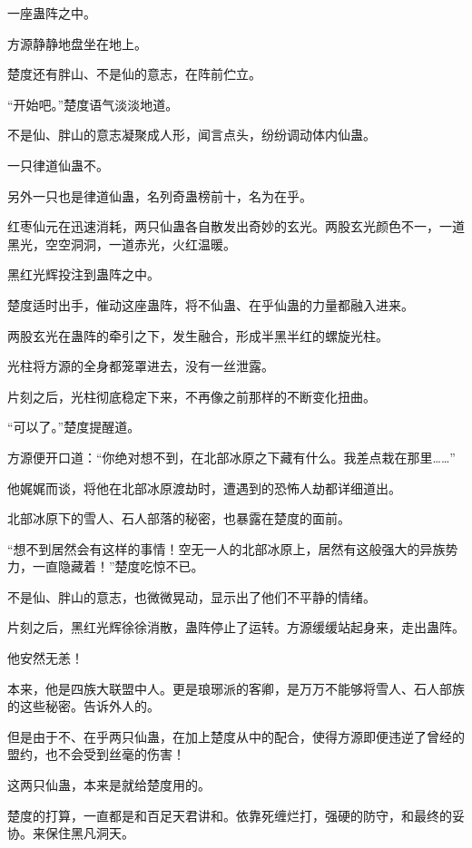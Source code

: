 
\begin{this_body}

一座蛊阵之中。

方源静静地盘坐在地上。

楚度还有胖山、不是仙的意志，在阵前伫立。

“开始吧。”楚度语气淡淡地道。

不是仙、胖山的意志凝聚成人形，闻言点头，纷纷调动体内仙蛊。

一只律道仙蛊不。

另外一只也是律道仙蛊，名列奇蛊榜前十，名为在乎。

红枣仙元在迅速消耗，两只仙蛊各自散发出奇妙的玄光。两股玄光颜色不一，一道黑光，空空洞洞，一道赤光，火红温暖。

黑红光辉投注到蛊阵之中。

楚度适时出手，催动这座蛊阵，将不仙蛊、在乎仙蛊的力量都融入进来。

两股玄光在蛊阵的牵引之下，发生融合，形成半黑半红的螺旋光柱。

光柱将方源的全身都笼罩进去，没有一丝泄露。

片刻之后，光柱彻底稳定下来，不再像之前那样的不断变化扭曲。

“可以了。”楚度提醒道。

方源便开口道：“你绝对想不到，在北部冰原之下藏有什么。我差点栽在那里……”

他娓娓而谈，将他在北部冰原渡劫时，遭遇到的恐怖人劫都详细道出。

北部冰原下的雪人、石人部落的秘密，也暴露在楚度的面前。

“想不到居然会有这样的事情！空无一人的北部冰原上，居然有这般强大的异族势力，一直隐藏着！”楚度吃惊不已。

不是仙、胖山的意志，也微微晃动，显示出了他们不平静的情绪。

片刻之后，黑红光辉徐徐消散，蛊阵停止了运转。方源缓缓站起身来，走出蛊阵。

他安然无恙！

本来，他是四族大联盟中人。更是琅琊派的客卿，是万万不能够将雪人、石人部族的这些秘密。告诉外人的。

但是由于不、在乎两只仙蛊，在加上楚度从中的配合，使得方源即便违逆了曾经的盟约，也不会受到丝毫的伤害！

这两只仙蛊，本来是就给楚度用的。

楚度的打算，一直都是和百足天君讲和。依靠死缠烂打，强硬的防守，和最终的妥协。来保住黑凡洞天。


\end{this_body}
